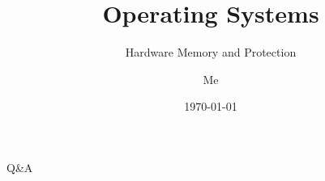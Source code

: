 \documentclass[12pt]{beamer}
\title{Operating Systems}
\subtitle{Hardware Memory and Protection}
\author{Me}
\date{\today}
\begin{document}
  \begin{frame}
    \titlepage
  \end{frame}

  
  
  

  \begin{frame}
  \begin{center}
  \Huge Q\&A
  \end{center}
  \end{frame}
\end{document}
